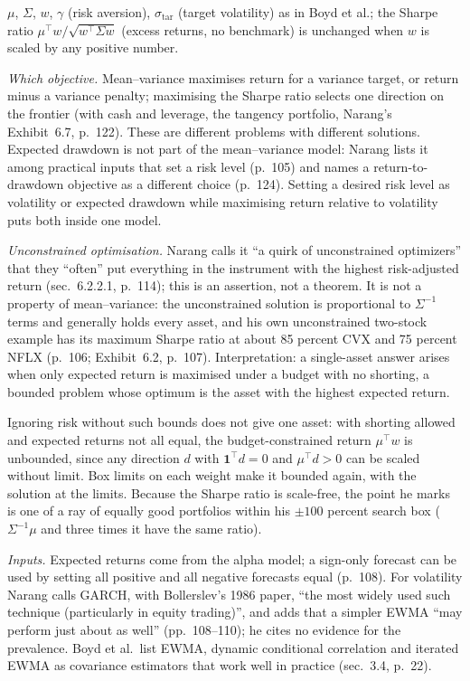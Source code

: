 \begin{qfmodel}
 $\mu$, $\Sigma$, $w$, $\gamma$ (risk aversion), $\sigma_{\mathrm{tar}}$ (target volatility) as in Boyd et al.; the Sharpe ratio $\mu^\top w/\sqrt{w^\top\Sigma w}$ (excess returns, no benchmark) is unchanged when $w$ is scaled by any positive number.

 \emph{Which objective.} Mean--variance maximises return for a variance target, or return minus a variance penalty; maximising the Sharpe ratio selects one direction on the frontier (with cash and leverage, the tangency portfolio, Narang's Exhibit~6.7, p.~122). These are different problems with different solutions. Expected drawdown is not part of the mean--variance model: Narang lists it among practical inputs that set a risk level (p.~105) and names a return-to-drawdown objective as a different choice (p.~124). Setting a desired risk level as volatility or expected drawdown while maximising return relative to volatility puts both inside one model.

\emph{Unconstrained optimisation.} Narang calls it ``a quirk of unconstrained optimizers'' that they ``often'' put everything in the instrument with the highest risk-adjusted return (sec.~6.2.2.1, p.~114); this is an assertion, not a theorem. It is not a property of mean--variance: the unconstrained solution is proportional to $\Sigma^{-1}$ terms and generally holds every asset, and his own unconstrained two-stock example has its maximum Sharpe ratio at about 85 percent CVX and 75 percent NFLX (p.~106; Exhibit~6.2, p.~107). Interpretation: a single-asset answer arises when only expected return is maximised under a budget with no shorting, a bounded problem whose optimum is the asset with the highest expected return.

Ignoring risk without such bounds does not give one asset: with shorting allowed and expected returns not all equal, the budget-constrained return $\mu^\top w$ is unbounded, since any direction $d$ with $\mathbf 1^\top d=0$ and $\mu^\top d>0$ can be scaled without limit. Box limits on each weight make it bounded again, with the solution at the limits. Because the Sharpe ratio is scale-free, the point he marks is one of a ray of equally good portfolios within his $\pm100$ percent search box ($\Sigma^{-1}\mu$ and three times it have the same ratio).

 \emph{Inputs.} Expected returns come from the alpha model; a sign-only forecast can be used by setting all positive and all negative forecasts equal (p.~108). For volatility Narang calls GARCH, with Bollerslev's 1986 paper, ``the most widely used such technique (particularly in equity trading)'', and adds that a simpler EWMA ``may perform just about as well'' (pp.~108--110); he cites no evidence for the prevalence. Boyd et al.\ list EWMA, dynamic conditional correlation and iterated EWMA as covariance estimators that work well in practice (sec.~3.4, p.~22).


\end{qfmodel}

